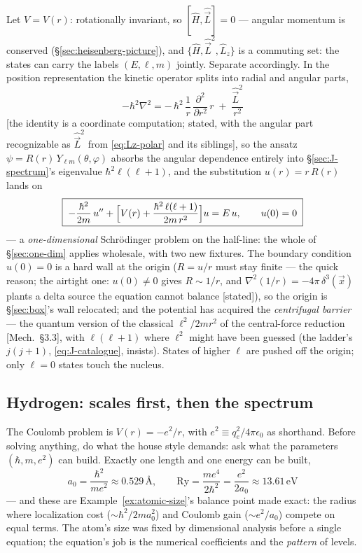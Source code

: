 \documentclass[11pt]{article}
\theoremstyle{plain}
\theoremstyle{definition}
\theoremstyle{remark}
\newcommand{\pd}[2]{\frac{\partial #1}{\partial #2}}
\newcommand{\vx}{\vec{x}}
\newcommand{\op}[1]{\hat{#1}}
\begin{document}
Let $V = V(r)$: rotationally invariant, so $[\op H, \op{\vec L}] =
0$ --- angular momentum is conserved
(\S\ref{sec:heisenberg-picture}), and
$\{\op H, \op{\vec L}^2, \op L_z\}$ is a commuting set: the states
can carry the labels $(E, \ell, m)$ jointly. Separate accordingly.
In the position representation the kinetic operator splits into
radial and angular parts,
\begin{equation}
  -\hbar^2\nabla^2
  = -\,\hbar^2\,\frac1r\,\pd{^2}{r^2}\,r
  \;+\; \frac{\op{\vec L}^2}{r^2}
  \label{eq:laplacian-split}
\end{equation}
[the identity is a coordinate computation; stated, with the angular
part recognizable as $\op{\vec L}^2$ from \eqref{eq:Lz-polar} and
its siblings], so the ansatz
$\psi = R(r)\,Y_{\ell m}(\theta, \varphi)$ absorbs the angular
dependence entirely into \S\ref{sec:J-spectrum}'s eigenvalue
$\hbar^2\ell(\ell+1)$, and the substitution $u(r) = r\,R(r)$ lands
on
\begin{equation}
  \boxed{\;
  -\frac{\hbar^2}{2m}\,u''
  + \Bigl[
      V(r) + \frac{\hbar^2\,\ell(\ell+1)}{2m\,r^2}
    \Bigr] u
  = E\,u,
  \qquad
  u(0) = 0
  \;}
  \label{eq:radial-equation}
\end{equation}
--- a \emph{one-dimensional} Schr\"odinger problem on the half-line:
the whole of \S\ref{sec:one-dim} applies wholesale, with two new
fixtures. The boundary condition $u(0) = 0$ is a hard wall at the
origin ($R = u/r$ must stay finite --- the quick reason; the
airtight one: $u(0) \ne 0$ gives $R \sim 1/r$, and
$\nabla^2(1/r) = -4\pi\,\delta^3(\vx)$ plants a delta source the
equation cannot balance [stated]), so the origin is
\S\ref{sec:box}'s wall relocated; and the potential has acquired
the \emph{centrifugal barrier} --- the quantum version of the
classical $\ell^2/2mr^2$ of the central-force reduction
[Mech.\ \S3.3], with $\ell(\ell+1)$ where $\ell^2$ might have
been guessed (the ladder's $j(j+1)$, \eqref{eq:J-catalogue},
insists). States of higher $\ell$ are pushed off the origin; only
$\ell = 0$ states touch the nucleus.

\subsection{Hydrogen: scales first, then the spectrum}
\label{sec:hydrogen-spectrum}

The Coulomb problem is
$V(r) = -e^2/r$, with $e^2 \equiv q_e^2/4\pi\epsilon_0$ as
shorthand. Before solving anything, do what the house style demands:
ask what the parameters $(\hbar, m, e^2)$ can build. Exactly one
length and one energy can be built,
\begin{equation}
  a_0 = \frac{\hbar^2}{m e^2}
  \approx 0.529\,\text{\AA},
  \qquad
  \mathrm{Ry} = \frac{m e^4}{2\hbar^2}
  = \frac{e^2}{2 a_0}
  \approx 13.61\,\mathrm{eV}
  \label{eq:bohr-scales}
\end{equation}
--- and these are Example~\ref{ex:atomic-size}'s balance point made
exact: the radius where localization cost
($\sim \hbar^2/2ma_0^2$) and Coulomb gain ($\sim e^2/a_0$)
compete on equal terms. The atom's size was fixed by dimensional
analysis before a single equation; the equation's job is the
numerical coefficients and the \emph{pattern} of levels.
\end{document}
